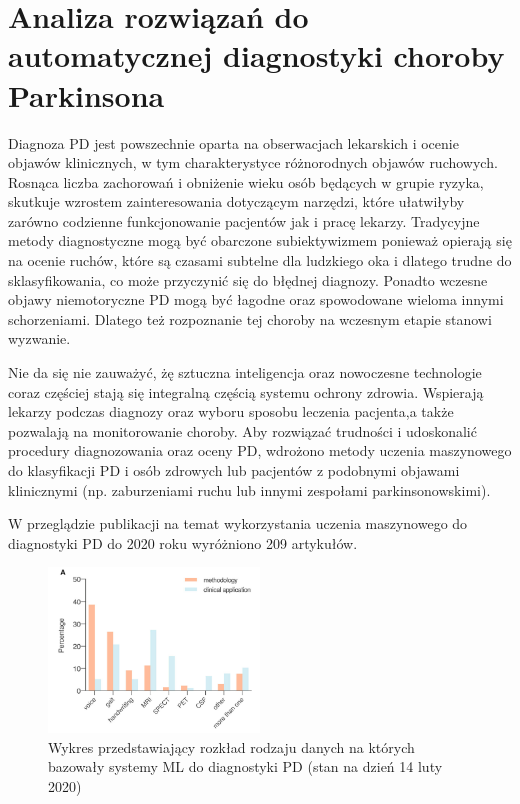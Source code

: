 \chapter{Analiza rozwiązań do automatycznej diagnostyki choroby Parkinsona}\label{ch:analiza-rozwiazan}


Diagnoza PD jest powszechnie oparta na obserwacjach lekarskich i ocenie objawów klinicznych, w tym charakterystyce różnorodnych objawów ruchowych.
Rosnąca liczba zachorowań i obniżenie wieku osób będących w grupie ryzyka, skutkuje wzrostem zainteresowania dotyczącym narzędzi, które ułatwiłyby
zarówno codzienne funkcjonowanie pacjentów jak i pracę lekarzy.
Tradycyjne metody diagnostyczne mogą być obarczone subiektywizmem ponieważ opierają się na ocenie ruchów, które są czasami subtelne dla
ludzkiego oka i dlatego trudne do sklasyfikowania, co może przyczynić się do błędnej diagnozy.
Ponadto wczesne objawy niemotoryczne PD mogą być łagodne oraz spowodowane wieloma innymi schorzeniami.
Dlatego też rozpoznanie tej choroby na wczesnym etapie stanowi wyzwanie.

Nie da się nie zauważyć, żę sztuczna inteligencja oraz nowoczesne technologie coraz częściej stają się integralną częścią systemu ochrony zdrowia.
Wspierają lekarzy podczas diagnozy oraz wyboru sposobu leczenia pacjenta,a także pozwalają na monitorowanie choroby.
Aby rozwiązać trudności i udoskonalić procedury diagnozowania oraz oceny PD, wdrożono metody uczenia maszynowego do klasyfikacji PD i osób zdrowych lub
pacjentów z podobnymi objawami klinicznymi (np. zaburzeniami ruchu lub innymi zespołami parkinsonowskimi).


W przeglądzie publikacji na temat wykorzystania uczenia maszynowego do diagnostyki PD do 2020 roku wyróżniono 209 artykułów\cite{ML_for_PD_review}.


\begin{figure}[htbp]
	\centering
	\includegraphics[width=0.5\textwidth]{./img/plot_PD_detection_methods}
	\caption{Wykres przedstawiający rozkład rodzaju danych na których bazowały systemy ML do diagnostyki PD\cite{ML_for_PD_review} (stan na dzień 14 luty 2020)}
    \label{fig:pd_detection_methods}\label{fig:figure}
\end{figure}




